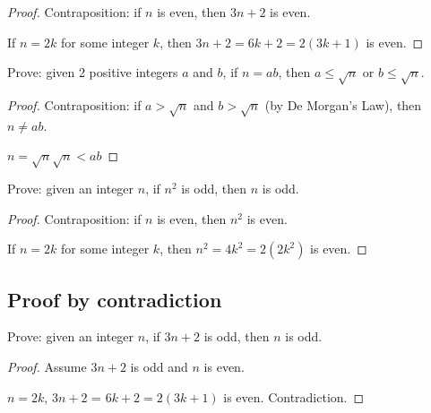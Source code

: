 \begin{proof}

Contraposition: if $n$ is even, then $3n + 2$ is even.

If $n = 2k$ for some integer $k$, then $3n + 2 = 6k + 2 = 2(3k + 1)$ is even.

\end{proof}

\begin{ex}

Prove: given 2 positive integers $a$ and $b$, if $n = ab$, then $a \leq \sqrt{n}$ or $b \leq \sqrt{n}$.

\end{ex}

\begin{proof}

Contraposition: if $a > \sqrt{n}$ and $b > \sqrt{n}$ (by De Morgan's Law), then $n \neq ab$.

$n = \sqrt{n} \sqrt{n} < ab$

\end{proof}

\begin{ex}

Prove: given an integer $n$, if $n^2$ is odd, then $n$ is odd.

\end{ex}

\begin{proof}

Contraposition: if $n$ is even, then $n^2$ is even.

If $n = 2k$ for some integer $k$, then $n^2 = 4k^2 = 2(2k^2)$ is even.

\end{proof}

\subsection{Proof by contradiction}

\begin{ex}

Prove: given an integer $n$, if $3n + 2$ is odd, then $n$ is odd.

\end{ex}

\begin{proof}

Assume $3n + 2$ is odd and $n$ is even.

$n = 2k$, $3n + 2$ = $6k + 2 = 2(3k + 1)$ is even. Contradiction.

\end{proof}

